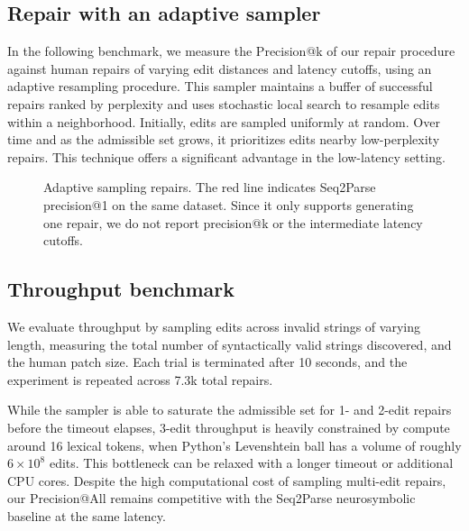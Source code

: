 \documentclass[sigplan,review,anonymous,acmsmall]{acmart}\settopmatter{printfolios=false,printccs=false,printacmref=false}
\begin{document}
\subsection{Repair with an adaptive sampler}

In the following benchmark, we measure the Precision@k of our repair procedure against human repairs of varying edit distances and latency cutoffs, using an adaptive resampling procedure. This sampler maintains a buffer of successful repairs ranked by perplexity and uses stochastic local search to resample edits within a neighborhood. Initially, edits are sampled uniformly at random. Over time and as the admissible set grows, it prioritizes edits nearby low-perplexity repairs. This technique offers a significant advantage in the low-latency setting.

\begin{figure}[H]
\resizebox{.24\textwidth}{!}{}
\resizebox{.25\textwidth}{!}{}
\resizebox{.24\textwidth}{!}{}
\resizebox{.24\textwidth}{!}{}
\caption{Adaptive sampling repairs. The red line indicates Seq2Parse precision@1 on the same dataset. Since it only supports generating one repair, we do not report precision@k or the intermediate latency cutoffs.}\label{fig:adaptive}
\end{figure}

\subsection{Throughput benchmark}

\begin{figure}
  \vspace{-10pt}
  \resizebox{.4\textwidth}{!}{}
  \label{fig:throughput}
\end{figure}

We evaluate throughput by sampling edits across invalid strings of varying length, measuring the total number of syntactically valid strings discovered, and the human patch size. Each trial is terminated after 10 seconds, and the experiment is repeated across 7.3k total repairs.

While the sampler is able to saturate the admissible set for 1- and 2-edit repairs before the timeout elapses, 3-edit throughput is heavily constrained by compute around 16 lexical tokens, when Python's Levenshtein ball has a volume of roughly $6\times 10^8$ edits. This bottleneck can be relaxed with a longer timeout or additional CPU cores. Despite the high computational cost of sampling multi-edit repairs, our Precision@All remains competitive with the Seq2Parse neurosymbolic baseline at the same latency.
\end{document}
